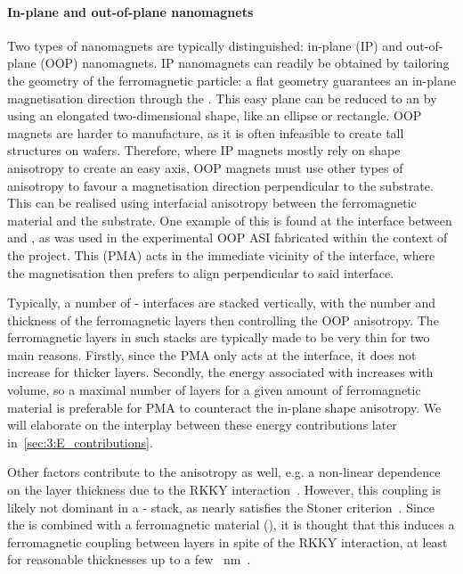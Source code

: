 \paragraph{In-plane and out-of-plane nanomagnets} %
Two types of nanomagnets are typically distinguished: in-plane (IP) and out-of-plane (OOP) nanomagnets.
IP nanomagnets can readily be obtained by tailoring the geometry of the ferromagnetic particle: a flat geometry guarantees an in-plane magnetisation direction through the .
This easy plane can be reduced to an  by using an elongated two-dimensional shape, like an ellipse or rectangle.
OOP magnets are harder to manufacture, as it is often infeasible to create tall structures on wafers.
Therefore, where IP magnets mostly rely on shape anisotropy to create an easy axis, OOP magnets must use other types of anisotropy to favour a magnetisation direction perpendicular to the substrate.
This can be realised using interfacial anisotropy between the ferromagnetic material and the substrate.
One example of this is found at the interface between  and , as was used in the experimental OOP ASI fabricated within the context of the \spinengine project.
This  (PMA) acts in the immediate vicinity of the interface, where the magnetisation then prefers to align perpendicular to said interface. \par
Typically, a number of - interfaces are stacked vertically, with the number and thickness of the ferromagnetic  layers then controlling the OOP anisotropy.
The ferromagnetic layers in such stacks are typically made to be very thin for two main reasons.
Firstly, since the PMA only acts at the interface, it does not increase for thicker layers.
Secondly, the energy associated with  increases with volume, so a maximal number of layers for a given amount of ferromagnetic material is preferable for PMA to counteract the in-plane shape anisotropy.
We will elaborate on the interplay between these energy contributions later in~\cref{sec:3:E_contributions}. \par
Other factors contribute to the anisotropy as well, e.g. a non-linear dependence on the  layer thickness due to the RKKY interaction~\cite{RKKY_RK,RKKY_K,RKKY_Y}.
However, this coupling is likely not dominant in a - stack, as  nearly satisfies the Stoner criterion~\cite{PtMagneticOrder}.
Since the  is combined with a ferromagnetic material (), it is thought that this induces a ferromagnetic coupling between  layers in spite of the RKKY interaction, at least for reasonable  thicknesses up to a few \SI{}{\nano\metre}~\cite{PerpendicularMagnetizationASI}.

